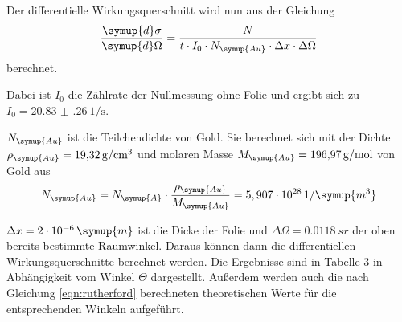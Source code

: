Der differentielle Wirkungsquerschnitt wird nun aus der Gleichung
\begin{equation}
  \frac{\symup{d}\sigma}{\symup{d}\Omega} = \frac{N}{t \cdot I_0 \cdot N_\symup{Au} \cdot \Delta x \cdot \Delta \Omega}
  \label{eqn:wq}
\end{equation}
berechnet.

Dabei ist $I_0$ die Zählrate der Nullmessung ohne Folie und ergibt sich zu $I_0 =\SI{20.83(26)}{1\per\second}$.

$N_\symup{Au}$ ist die Teilchendichte von Gold. Sie berechnet sich mit der Dichte
$\rho_\symup{Au} = \SI{19.32}{\gram\per\centi\meter^3}$ \cite{sample} und molaren Masse $M_\symup{Au} = \SI{196.97}{\gram\per\mol}$ \cite{sample}
von Gold aus
\begin{equation}
  N_\symup{Au} = N_\symup{A} \cdot \frac{\rho_\symup{Au}}{M_\symup{Au}} = 5,907 \cdot 10^{28} \, 1/\symup{m^3}
  \label{eqn:teilchendichte}
\end{equation}


$\Delta x = 2 \cdot 10^{-6} \, \symup{m}$ ist die Dicke der Folie und $\Delta \Omega = \SI{0.0118}{sr}$
der oben bereits bestimmte Raumwinkel. Daraus können dann die
differentiellen Wirkungsquerschnitte berechnet werden. Die Ergebnisse sind in Tabelle 3
in Abhängigkeit vom Winkel $\Theta$ dargestellt. Außerdem werden auch die nach
Gleichung \ref{eqn:rutherford} berechneten theoretischen Werte für die entsprechenden
Winkeln aufgeführt.


